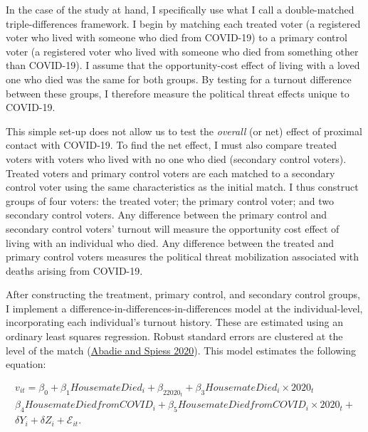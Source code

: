 \documentclass[
  12pt,
]{article}
\begin{document}
In the case of the study at hand, I specifically use what I call a double-matched triple-differences framework. I begin by matching each treated voter (a registered voter who lived with someone who died from COVID-19) to a primary control voter (a registered voter who lived with someone who died from something other than COVID-19). I assume that the opportunity-cost effect of living with a loved one who died was the same for both groups. By testing for a turnout difference between these groups, I therefore measure the political threat effects unique to COVID-19.

This simple set-up does not allow us to test the \emph{overall} (or net) effect of proximal contact with COVID-19. To find the net effect, I must also compare treated voters with voters who lived with no one who died (secondary control voters). Treated voters and primary control voters are each matched to a secondary control voter using the same characteristics as the initial match. I thus construct groups of four voters: the treated voter; the primary control voter; and two secondary control voters. Any difference between the primary control and secondary control voters' turnout will measure the opportunity cost effect of living with an individual who died. Any difference between the treated and primary control voters measures the political threat mobilization associated with deaths arising from COVID-19.

After constructing the treatment, primary control, and secondary control groups, I implement a difference-in-differences-in-differences model at the individual-level, incorporating each individual's turnout history. These are estimated using an ordinary least squares regression. Robust standard errors are clustered at the level of the match (\protect\hyperlink{ref-Abadie2020}{Abadie and Spiess 2020}). This model estimates the following equation:

\begin{gather}
\label{eq:1}
v_{it} = \beta_0 + \beta_1Housemate Died_{i}+\beta_22020_{t} + \beta_3Housemate Died_{i}\times 2020_{t} \nonumber \\
\beta_4Housemate Died from COVID_{i} + \beta_5Housemate Died from COVID_{i}\times 2020_{t} + \\
\delta{Y}_{i} + \delta{Z}_{i} + \mathcal{E}_{it}. \nonumber
\end{gather}
\end{document}
